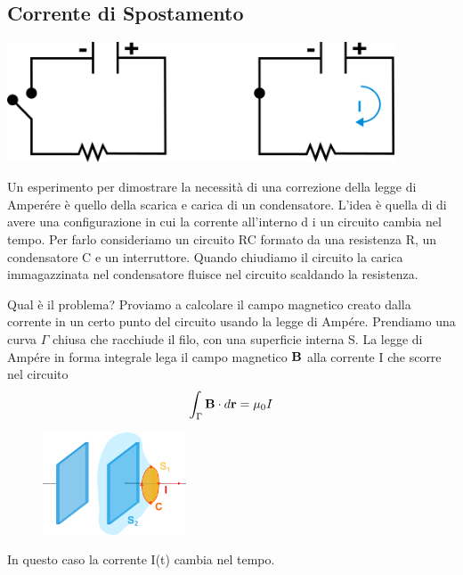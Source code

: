 \subsection{Corrente di Spostamento}
\vspace{0.2cm}
\begin{center}
	\includegraphics[width = 11.5cm]{images/transport_current}
\end{center}

Un esperimento per dimostrare la necessit\`a di una correzione della legge di Amper\'ere \`e quello della scarica e carica di un condensatore. L'idea \`e quella di di avere una configurazione in cui la corrente all'interno d i un circuito cambia nel tempo. Per farlo consideriamo un circuito RC formato da una resistenza R, un condensatore C e un interruttore. Quando chiudiamo il circuito la carica immagazzinata nel condensatore fluisce  nel circuito scaldando la resistenza.
\newline

Qual \`e il problema? Proviamo a calcolare il campo magnetico creato dalla corrente in un certo punto del circuito  usando la legge di Amp\'ere. Prendiamo una curva $\Gamma $ chiusa che racchiude il filo, con una superficie interna S. La legge di Amp\'ere in forma integrale lega il campo magnetico $\bold{B}$ alla corrente I che scorre nel circuito 
\begin{equation*}
	\int_{\Gamma} \bold{B} \cdot d \bold{r} = \mu_0 I
\end{equation*}
\begin{figure}  %
    \centering
    \includegraphics[width=0.38\textwidth]{images/moving_path}
\end{figure}
In questo caso la corrente I(t) cambia nel tempo.

